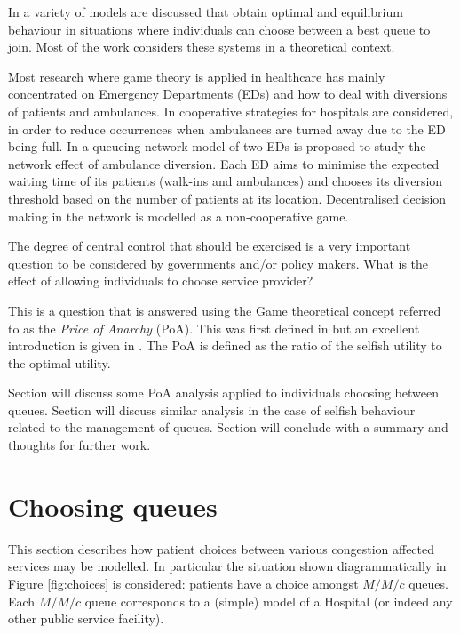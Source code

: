 \documentclass[a4paper,11pt]{article}
\begin{document}
In \cite{Adler1969,Bell1983,Edelson1971,Knudsen1972,Luski1976,Naor1969,Yechiali1972} a variety of models are discussed that obtain optimal and equilibrium behaviour in situations where individuals can choose between a best queue to join.
Most of the work considers these systems in a theoretical context.

Most research where game theory is applied in healthcare has mainly concentrated on Emergency Departments (EDs) and how to deal with diversions of patients and ambulances.
In \cite{Hagtvedt2009} cooperative strategies for hospitals are considered, in order to reduce occurrences when ambulances are turned away due to the ED being full.
In \cite{Deo2011} a queueing network model of two EDs is proposed to study the network effect of ambulance diversion.
Each ED aims to minimise the expected waiting time of its patients (walk-ins and ambulances) and chooses its diversion threshold based on the number of patients at its location.
Decentralised decision making in the network is modelled as a non-cooperative game.

The degree of central control that should be exercised is a very important question to be considered by governments and/or policy makers.
What is the effect of allowing individuals to choose service provider?

This is a question that is answered using the Game theoretical concept referred to as the \textit{Price of Anarchy} (PoA).
This was first defined in \cite{Koutsoupias2009} but an excellent introduction is given in \cite{Roughgarden2005}.
The PoA is defined as the ratio of the selfish utility to the optimal utility.

Section \label{sec:choosingqueues} will discuss some PoA analysis applied to individuals choosing between queues.
Section \label{sec:managingqueues} will discuss similar analysis in the case of selfish behaviour related to the management of queues.
Section \label{sec:conclusion} will conclude with a summary and thoughts for further work.

\section{Choosing queues}\label{sec:choosingqueues}

This section describes how patient choices between various congestion affected services may be modelled.
In particular the situation shown diagrammatically in Figure \ref{fig:choices} is considered: patients have a choice amongst $M/M/c$ queues.
Each $M/M/c$ queue corresponds to a (simple) model of a Hospital (or indeed any other public service facility).
\end{document}
